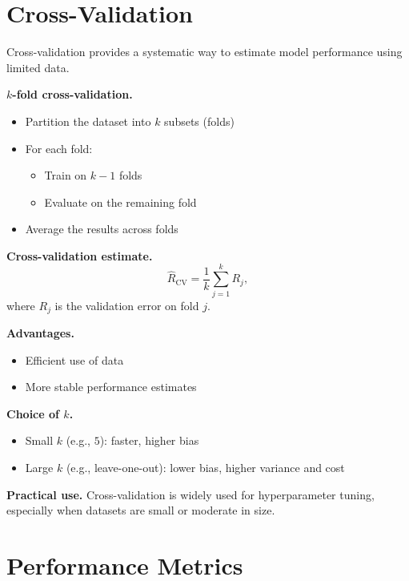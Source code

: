 \section{Cross-Validation}

Cross-validation provides a systematic way to estimate model performance using limited data.

\medskip

\noindent
\textbf{$k$-fold cross-validation.}
\begin{itemize}
    \item Partition the dataset into $k$ subsets (folds)
    \item For each fold:
    \begin{itemize}
        \item Train on $k-1$ folds
        \item Evaluate on the remaining fold
    \end{itemize}
    \item Average the results across folds
\end{itemize}

\medskip

\noindent
\textbf{Cross-validation estimate.}
\[
\hat{R}_{\text{CV}} = \frac{1}{k} \sum_{j=1}^k R_j,
\]
where $R_j$ is the validation error on fold $j$.

\medskip

\noindent
\textbf{Advantages.}
\begin{itemize}
    \item Efficient use of data
    \item More stable performance estimates
\end{itemize}

\medskip

\noindent
\textbf{Choice of $k$.}
\begin{itemize}
    \item Small $k$ (e.g., $5$): faster, higher bias
    \item Large $k$ (e.g., leave-one-out): lower bias, higher variance and cost
\end{itemize}

\medskip

\noindent
\textbf{Practical use.}  
Cross-validation is widely used for hyperparameter tuning, especially when datasets are small or moderate in size.

\section{Performance Metrics}

